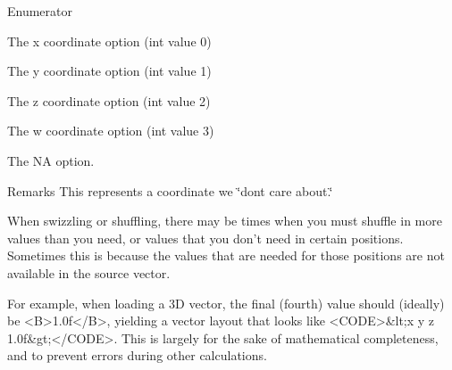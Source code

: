\begin{Desc}
\item[Enumerator]\par
\begin{description}
\item[{\em 
\hypertarget{namespacegofxmath_a6c05153fd2e2d4119d91daca01a06741a1b2cd11034f7c778f8e0930f57a15577}{}X\label{namespacegofxmath_a6c05153fd2e2d4119d91daca01a06741a1b2cd11034f7c778f8e0930f57a15577}
}]The x coordinate option (int value 0) \item[{\em 
\hypertarget{namespacegofxmath_a6c05153fd2e2d4119d91daca01a06741a98d90627fe2347723d56eb2b5fd7492d}{}Y\label{namespacegofxmath_a6c05153fd2e2d4119d91daca01a06741a98d90627fe2347723d56eb2b5fd7492d}
}]The y coordinate option (int value 1) \item[{\em 
\hypertarget{namespacegofxmath_a6c05153fd2e2d4119d91daca01a06741a56adb0786cb240ee8baed7fe3e48c58e}{}Z\label{namespacegofxmath_a6c05153fd2e2d4119d91daca01a06741a56adb0786cb240ee8baed7fe3e48c58e}
}]The z coordinate option (int value 2) \item[{\em 
\hypertarget{namespacegofxmath_a6c05153fd2e2d4119d91daca01a06741ae38bfc064233b06432b115dca29d5c5a}{}W\label{namespacegofxmath_a6c05153fd2e2d4119d91daca01a06741ae38bfc064233b06432b115dca29d5c5a}
}]The w coordinate option (int value 3) \item[{\em 
\hypertarget{namespacegofxmath_a6c05153fd2e2d4119d91daca01a06741a9fc8bb14e129d2beab9c4027f9c0beef}{}N\+A\label{namespacegofxmath_a6c05153fd2e2d4119d91daca01a06741a9fc8bb14e129d2beab9c4027f9c0beef}
}]The N\+A option. \begin{DoxyRemark}{Remarks}
This represents a coordinate we \char`\"{}don\textquotesingle{}t care about.\char`\"{} \begin{DoxyVerb}          When swizzling or shuffling, there may be times when you must shuffle in
          more values than you need, or values that you don't need in certain positions.  Sometimes this is
          because the values that are needed for those positions are not available in the source vector.

          For example, when loading a 3D vector, the final (fourth) value should (ideally) be <B>1.0f</B>,
          yielding a vector layout that looks like <CODE>&lt;x y z 1.0f&gt;</CODE>.
          This is largely for the sake of mathematical completeness, and to prevent errors during other calculations.


\end{DoxyVerb}
\end{DoxyRemark}
\end{description}
\end{Desc}
